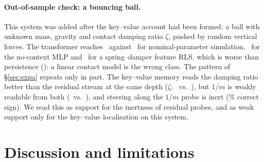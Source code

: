 \paragraph{Out-of-sample check: a bouncing ball.} This system was added after the key--value account had been formed:
a ball with unknown mass, gravity and contact damping ratio $\zeta$, pushed by random vertical forces. The transformer
reaches \BQTF\ against \BQNom\ for nominal-parameter simulation, \BQMLP\ for the no-context MLP and \BQRLS\ for a
spring--damper feature RLS, which is worse than persistence (\BQPer): a linear contact model is the wrong class. The
pattern of \S\ref{sec:expa} repeats only in part. The key--value memory reads the damping ratio better than the residual
stream at the same depth ($\zeta$: \BfwQzeta\ vs.\ \BresQzeta), but $1/m$ is weakly readable from both (\BfwQinvm\ vs.\
\BresQinvm), and steering along the $1/m$ probe is inert (\BsteerQ\% correct sign). We read this as support for the
inertness of residual probes, and as weak support only for the key--value localisation on this system.





\section{Discussion and limitations}\label{sec:disc}

